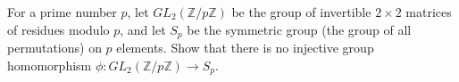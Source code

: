 For a prime number \(p\), let \(GL_2(\mathbb{Z}/p\mathbb{Z})\) be the group of invertible \(2 \times 2\) matrices of residues modulo \(p\), and let \(S_p\) be the symmetric group (the group of all permutations) on \(p\) elements. Show that there is no injective group homomorphism \(\phi \colon  GL_2(\mathbb{Z}/p\mathbb{Z}) \to S_p\).